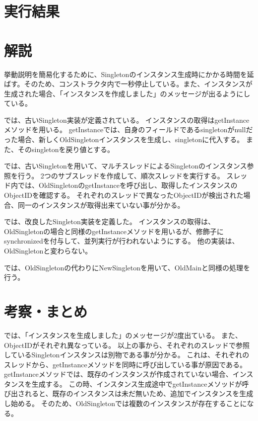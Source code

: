 \documentclass[uplatex]{jsarticle}
\begin{document}
\section{実行結果}




\section{解説}
挙動説明を簡易化するために、Singletonのインスタンス生成時にかかる時間を延ばす。そのため、コンストラクタ内で一秒停止している。また、インスタンスが生成された場合、「インスタンスを作成しました」のメッセージが出るようにしている。

では、古いSingleton実装が定義されている。
インスタンスの取得はgetInstanceメソッドを用いる。
getInstanceでは、自身のフィールドであるsingletonがnullだった場合、新しくOldSingletonインスタンスを生成し、singletonに代入する。
また、そのsingletonを戻り値とする。


では、古いSingletonを用いて、マルチスレッドによるSingletonのインスタンス参照を行う。
2つのサブスレッドを作成して、順次スレッドを実行する。
スレッド内では、OldSingletonのgetInstanceを呼び出し、取得したインスタンスのObjectIDを確認する。
それぞれのスレッドで異なったObjectIDが検出された場合、同一のインスタンスが取得出来ていない事が分かる。


では、改良したSingleton実装を定義した。
インスタンスの取得は、OldSingletonの場合と同様のgetInstanceメソッドを用いるが、修飾子にsynchronizedを付与して、並列実行が行われないようにする。
他の実装は、OldSingletonと変わらない。


では、OldSingletonの代わりにNewSingletonを用いて、OldMainと同様の処理を行う。


\section{考察・まとめ}
では、「インスタンスを生成しました」のメッセージが2度出ている。
また、ObjectIDがそれぞれ異なっている。
以上の事から、それぞれのスレッドで参照しているSingletonインスタンスは別物である事が分かる。
これは、それぞれのスレッドから、getInstanceメソッドを同時に呼び出している事が原因である。
getInstanceメソッドでは、既存のインスタンスが作成されていない場合、インスタンスを生成する。
この時、インスタンス生成途中でgetInstanceメソッドが呼び出されると、既存のインスタンスは未だ無いため、追加でインスタンスを生成し始める。
そのため、OldSingletonでは複数のインスタンスが存在することになる。
\end{document}
